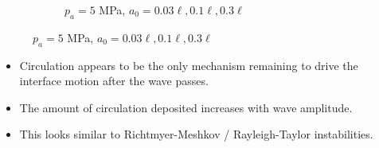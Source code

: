 \begin{frame}
\begin{figure}
\begin{subfigure}[b]{0.35\textwidth}
%
      \caption{\label{fig:us_circulation_a0_dependence} $p_a = 5$ MPa, $a_0 = 0.03\ell, 0.1\ell, 0.3\ell$}
    \end{subfigure}
  \end{figure}
  \begin{itemize}
  \item Circulation appears to be the only mechanism remaining to drive the interface motion after the wave passes.
  \item The amount of circulation deposited increases with wave amplitude.
  \item This looks similar to Richtmyer-Meshkov / Rayleigh-Taylor instabilities.
  \end{itemize}
\end{frame}
% 
% 

%
%

% 
% 
